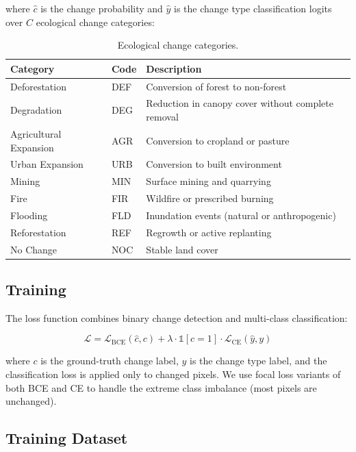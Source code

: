 \noindent where $\hat{c}$ is the change probability and $\hat{y}$ is the change type classification logits over $C$ ecological change categories:

\begin{table}[H]
\centering
\caption{Ecological change categories.}
\label{tab:change_categories}
\begin{tabularx}{\textwidth}{@{}llX@{}}
\toprule
\textbf{Category} & \textbf{Code} & \textbf{Description} \\
\midrule
Deforestation & DEF & Conversion of forest to non-forest \\
Degradation & DEG & Reduction in canopy cover without complete removal \\
Agricultural Expansion & AGR & Conversion to cropland or pasture \\
Urban Expansion & URB & Conversion to built environment \\
Mining & MIN & Surface mining and quarrying \\
Fire & FIR & Wildfire or prescribed burning \\
Flooding & FLD & Inundation events (natural or anthropogenic) \\
Reforestation & REF & Regrowth or active replanting \\
No Change & NOC & Stable land cover \\
\bottomrule
\end{tabularx}
\end{table}

\subsection{Training}

The loss function combines binary change detection and multi-class classification:

\begin{equation}
    \mathcal{L} = \mathcal{L}_{\text{BCE}}(\hat{c}, c) + \lambda \cdot \mathbb{1}[c=1] \cdot \mathcal{L}_{\text{CE}}(\hat{y}, y)
\end{equation}

\noindent where $c$ is the ground-truth change label, $y$ is the change type label, and the classification loss is applied only to changed pixels.
We use focal loss variants of both BCE and CE to handle the extreme class imbalance (most pixels are unchanged).

\subsection{Training Dataset}


